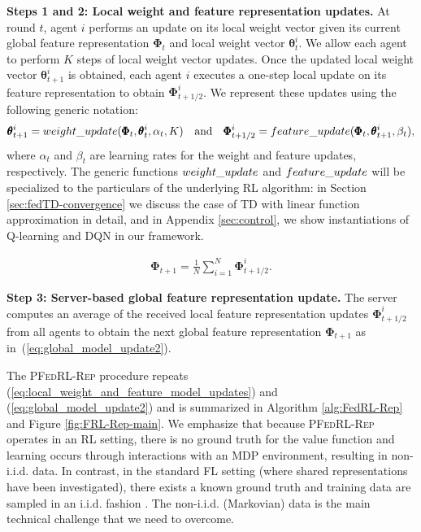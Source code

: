 \documentclass{article} %
\def\eqref#1{equation~\ref{#1}}
\theoremstyle{plain}
\theoremstyle{definition}
\theoremstyle{remark}
\renewcommand{\eqref}[1]{(\ref{#1})}
\newcommand{\FedRL}{\textsc{PFedRL-Rep}\xspace}
\begin{document}
\textbf{Steps 1 and 2: Local weight and feature representation updates.}
At round $t$, agent $i$ performs an update on its local weight vector given its current global feature representation $\pmb{\Phi}_t$ and local weight vector $\pmb{\theta}_t^i$. We allow each agent to perform $K$ steps of local weight vector updates. Once the updated local weight vector $\pmb{\theta}_{t+1}^i$ is obtained, each agent $i$ executes a one-step local update on its feature representation to obtain $\pmb{\Phi}^i_{t+1/2}$. We represent these updates using the following generic notation:
\begin{equation}
    \pmb{\theta}_{t+1}^i = \textsc{weight\_update} (\pmb{\Phi}_t, \pmb{\theta}_t^i, \alpha_t, K) \quad \text{and} \quad \pmb{\Phi}^i_{t+1/2}=\textsc{feature\_update}(\pmb{\Phi}_t, \pmb{\theta}_{t+1}^i, \beta_t),
    \label{eq:local_weight_and_feature_model_updates}
\end{equation}
where $\alpha_t$ and $\beta_t$ are learning rates for the weight and feature updates, respectively. The generic functions $\textsc{weight\_update}$ and $\textsc{feature\_update}$ will be specialized to the particulars of the underlying RL algorithm: in Section \ref{sec:fedTD-convergence} we discuss the case of TD with linear function approximation in detail, and in Appendix \ref{sec:control}, we show instantiations of Q-learning and DQN in our framework.






\begin{figure}
\vspace{-1.5em}
\begin{align}\label{eq:global_model_update2}
     \pmb{\Phi}_{t+1}=\frac{1}{N}\sum_{i=1}^N \pmb{\Phi}^i_{t+1/2}.
 \end{align} 
\vspace{-1.8em}
\end{figure}
\textbf{Step 3: Server-based global feature representation update.} The server computes an average of the received local feature representation updates $\pmb{\Phi}^i_{t+1/2}$ from all agents to obtain the next global feature representation $\pmb{\Phi}_{t+1}$ as in~\eqref{eq:global_model_update2}. 


The \FedRL procedure repeats \eqref{eq:local_weight_and_feature_model_updates}  and \eqref{eq:global_model_update2} and is summarized in Algorithm \ref{alg:FedRL-Rep} and Figure \ref{fig:FRL-Rep-main}. We emphasize that because \FedRL operates in an RL setting, there is no ground truth for the value function and learning occurs through interactions with an MDP environment, resulting in non-i.i.d. data. In contrast, in the standard FL setting (where shared representations have been investigated), there exists a known ground truth and training data are sampled in an i.i.d. fashion \citep{collins2021exploiting,tziotis2023straggler,xiong2023deprl}. The non-i.i.d. (Markovian) data is the main technical challenge that we need to overcome.
\end{document}
